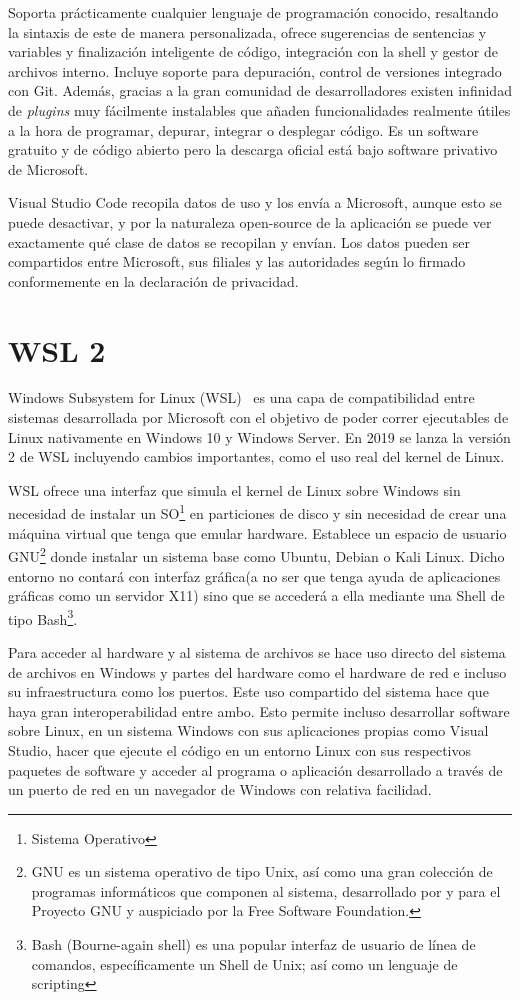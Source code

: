 \documentclass[a4paper, 12pt]{book}
\begin{document}
Soporta prácticamente cualquier lenguaje de programación conocido, resaltando la sintaxis de este de manera personalizada, ofrece sugerencias de sentencias y variables y finalización inteligente de código, integración con la shell y gestor de archivos interno. Incluye soporte para depuración, control de versiones integrado con Git. Además, gracias a la gran comunidad de desarrolladores existen infinidad de \emph{plugins} muy fácilmente instalables que añaden funcionalidades realmente útiles a la hora de programar, depurar, integrar o desplegar código. 
Es un software gratuito y de código abierto pero la descarga oficial está bajo software privativo de Microsoft. 

Visual Studio Code recopila datos de uso y los envía a Microsoft, aunque esto se puede desactivar, y por la naturaleza open-source de la aplicación se puede ver exactamente qué clase de datos se recopilan y envían. Los datos pueden ser compartidos entre Microsoft, sus filiales y las autoridades según lo firmado conformemente en la declaración de privacidad. 

\section{WSL 2}
\label{sec:WSL}
Windows Subsystem for Linux (WSL)~\cite{wsl2} es una capa de compatibilidad entre sistemas desarrollada por Microsoft con el objetivo de poder correr ejecutables de Linux nativamente en Windows 10 y Windows Server. En 2019 se lanza la versión 2 de WSL incluyendo cambios importantes, como el uso real del kernel de Linux. 

WSL ofrece una interfaz que simula el kernel de Linux sobre Windows sin necesidad de instalar un SO\footnote{Sistema Operativo} en particiones de disco y sin necesidad de crear una máquina virtual que tenga que emular hardware. Establece un espacio de usuario GNU\footnote{GNU es un sistema operativo de tipo Unix, así como una gran colección de programas informáticos que componen al sistema, desarrollado por y para el Proyecto GNU y auspiciado por la Free Software Foundation.} donde instalar un sistema base como Ubuntu, Debian o Kali Linux. Dicho entorno no contará con interfaz gráfica(a no ser que tenga ayuda de aplicaciones gráficas como un servidor X11) sino que se accederá a ella mediante una Shell de tipo Bash\footnote{Bash (Bourne-again shell) es una popular interfaz de usuario de línea de comandos, específicamente un Shell de Unix; así como un lenguaje de scripting}. 

Para acceder al hardware y al sistema de archivos se hace uso directo del sistema de archivos en Windows y partes del hardware como el hardware de red e incluso su infraestructura como los puertos. Este uso compartido del sistema hace que haya gran interoperabilidad entre ambo. Esto permite incluso desarrollar software sobre Linux, en un sistema Windows con sus aplicaciones propias como Visual Studio, hacer que ejecute el código en un entorno Linux con sus respectivos paquetes de software y acceder al programa o aplicación desarrollado a través de un puerto de red en un navegador de Windows con relativa facilidad. 
\end{document}
